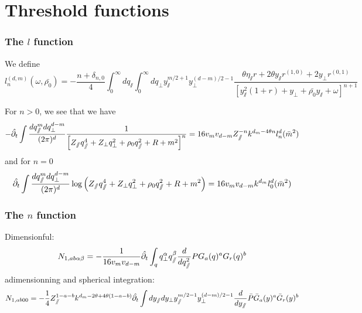 \label{app:thresholds}
\chapter{Threshold functions}

\subsection{The $l$ function}
We define
\begin{equation}
l_n^{(d,m)}(\omega, \bar{\rho_0}) = -\frac{n+\delta_{n,0}}{4} \int_0^{\infty} dq_\sslash \int_0^{\infty} dq_\perp y_\sslash^{m/2+1} y_\perp^{(d-m)/2-1} \frac{\theta \eta_\sslash r + 2 \theta y_\sslash r^{(1,0)}+ 2 y_\perp r^{(0,1)}}{\left[y_\sslash^2(1+r) + y_\perp + \bar{\rho_0} y_\sslash + \omega\right]^{n+1}}
\end{equation}

For $n>0$, we see that we have
\begin{equation}
-\hat{\partial_{t}} \int \frac{dq_\sslash^{m} dq_\perp^{d-m}}{(2\pi)^d} \frac{1}{\left[ Z_\sslash q_\sslash^4 + Z_\perp q_\perp^2 + \rho_0 q_\sslash^2 + R + m^2 \right]^{n}} = 16 v_m v_{d-m} Z_\sslash^{-n} k^{d_m-4\theta n} l_n^{d}(\bar{m}^2)
\end{equation}
and for $n=0$
\begin{equation}
\hat{\partial_{t}} \int \frac{dq_\sslash^{m} dq_\perp^{d-m}}{(2\pi)^d} \log{ \left( Z_\sslash q_\sslash^4 + Z_\perp q_\perp^2 + \rho_0 q_\sslash^2 + R + m^2 \right) } = 16 v_m v_{d-m} k^{d_m} l_0^{d}(\bar{m}^2)
\end{equation}

\subsection{The $n$ function}
Dimensionful:
\begin{equation}
N_{1,ab\alpha \beta} = -\frac{1}{16 v_m v_{d-m}} \hat{\partial_{t}} \int_q q_\perp^\alpha q_\sslash^\beta \frac{d}{d q_\sslash^2} P G_a(q)^a G_r(q)^b
\end{equation}
adimensionning and spherical integration:
\begin{equation}
N_{1,ab00} = -\frac{1}{4} Z_\sslash^{1-a-b} k^{d_m - 2 \theta + 4\theta(1-a-b)} \hat{\partial_{t}} \int dy_\sslash dy_\perp y_\sslash^{m/2-1} y_\perp^{(d-m)/2-1} \frac{d}{d y_\sslash} \bar{P} \bar{G}_a(y)^a \bar{G}_r(y)^b
\end{equation}

